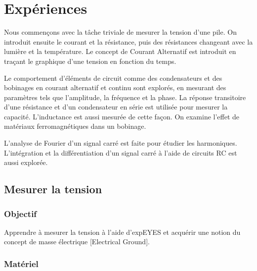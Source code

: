 \documentclass{book}
\begin{document}

\chapter{Expériences}





Nous commençons avec la tâche triviale de mesurer la tension d'une pile. On introduit ensuite le courant et la résistance, puis des résistances changeant avec la lumière et la température. Le concept de Courant Alternatif est introduit en traçant le graphique d'une tension en fonction du temps.



Le comportement d'éléments de circuit comme des condensateurs et des bobinages en courant alternatif et continu sont explorés, en mesurant des paramètres tels que l'amplitude, la fréquence et la phase. La réponse transitoire d'une résistance et d'un condensateur en série est utilisée pour mesurer la capacité. L'inductance est aussi mesurée de cette façon. On examine l'effet de matériaux ferromagnétiques dans un bobinage.



L'analyse de Fourier d'un signal carré est faite pour étudier les harmoniques. L'intégration et la différentiation d'un signal carré à l'aide de circuits RC est aussi explorée.







\section{Mesurer la tension}



\subsection{Objectif}


Apprendre à mesurer la tension à l'aide d'expEYES et acquérir une notion du concept de masse électrique [Electrical Ground].




\subsection{Matériel}
\end{document}
